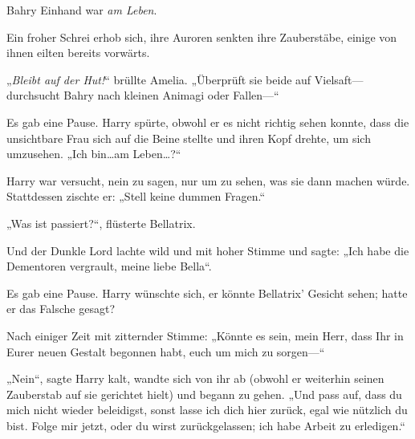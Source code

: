 Bahry Einhand war \emph{am Leben}.

Ein froher Schrei erhob sich, ihre Auroren senkten ihre Zauberstäbe, einige von ihnen eilten bereits vorwärts.

„\emph{Bleibt auf der Hut!}“ brüllte Amelia. „Überprüft sie beide auf Vielsaft—durchsucht Bahry nach kleinen Animagi oder Fallen—“

\later

 

Es gab eine Pause. Harry spürte, obwohl er es nicht richtig sehen konnte, dass die unsichtbare Frau sich auf die Beine stellte und ihren Kopf drehte, um sich umzusehen.
„Ich bin…am Leben…?“

Harry war versucht, nein zu sagen, nur um zu sehen, was sie dann machen würde. Stattdessen zischte er:
„Stell keine dummen Fragen.“

„Was ist passiert?“, flüsterte Bellatrix.

Und der Dunkle Lord lachte wild und mit hoher Stimme und sagte:
„Ich habe die Dementoren vergrault, meine liebe Bella“.

Es gab eine Pause. Harry wünschte sich, er könnte Bellatrix’ Gesicht sehen; hatte er das Falsche gesagt?

Nach einiger Zeit mit zitternder Stimme:
„Könnte es sein, mein Herr, dass Ihr in Eurer neuen Gestalt begonnen habt, euch um mich zu sorgen—“

„Nein“, sagte Harry kalt, wandte sich von ihr ab (obwohl er weiterhin seinen Zauberstab auf sie gerichtet hielt) und begann zu gehen.
„Und pass auf, dass du mich nicht wieder beleidigst, sonst lasse ich dich hier zurück, egal wie nützlich du bist. Folge mir jetzt, oder du wirst zurückgelassen; ich habe Arbeit zu erledigen.“

